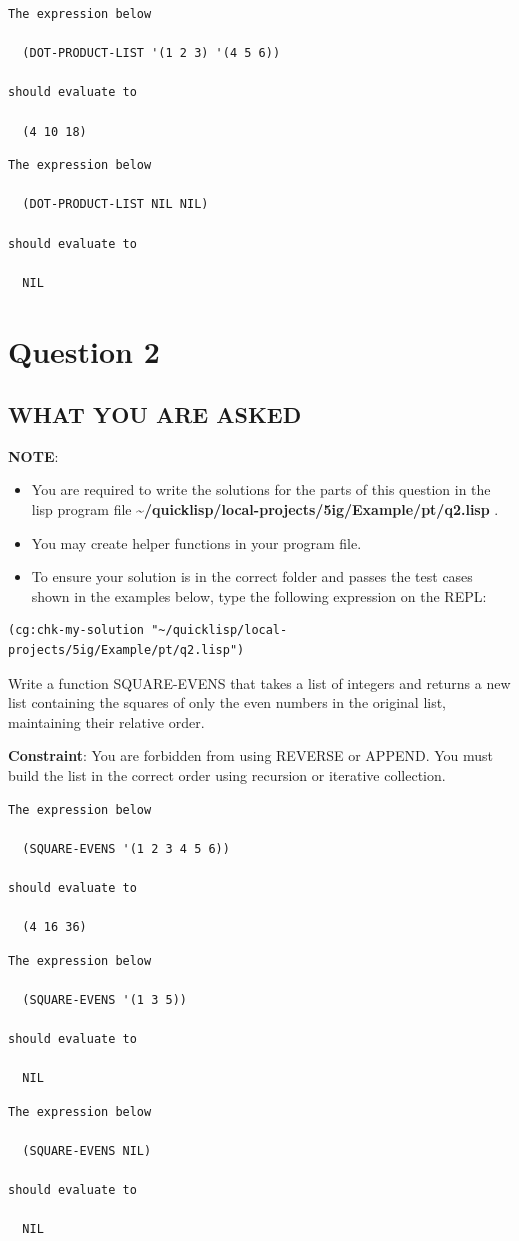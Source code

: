 \documentclass[11pt]{article}
\begin{document}
\begin{verbatim}
The expression below

  (DOT-PRODUCT-LIST '(1 2 3) '(4 5 6))

should evaluate to

  (4 10 18)
\end{verbatim}

\begin{verbatim}
The expression below

  (DOT-PRODUCT-LIST NIL NIL)

should evaluate to

  NIL
\end{verbatim}

\section*{Question 2}
\label{sec:orga4c6b4a}

\subsection*{WHAT YOU ARE ASKED}
\label{sec:org2cf8830}


\textbf{NOTE}:
\begin{itemize}
\item You are required to write the solutions for the parts of this question in the lisp program file \textbf{\textasciitilde{}/quicklisp/local-projects/5ig/Example/pt/q2.lisp} .
\item You may create helper functions in your program file.
\item To ensure your solution is in the correct folder and passes the test cases shown in the examples below,  type the following expression on the REPL:
\end{itemize}

\begin{verbatim}
(cg:chk-my-solution "~/quicklisp/local-projects/5ig/Example/pt/q2.lisp")
\end{verbatim}

Write a function SQUARE-EVENS that takes a list of integers and returns a new list containing the squares of only the even numbers in the original list, maintaining their relative order. 

\textbf{Constraint}: You are forbidden from using REVERSE or APPEND. You must build the list in the correct order using recursion or iterative collection.

\begin{verbatim}
The expression below

  (SQUARE-EVENS '(1 2 3 4 5 6))

should evaluate to

  (4 16 36)
\end{verbatim}

\begin{verbatim}
The expression below

  (SQUARE-EVENS '(1 3 5))

should evaluate to

  NIL
\end{verbatim}

\begin{verbatim}
The expression below

  (SQUARE-EVENS NIL)

should evaluate to

  NIL
\end{verbatim}
\end{document}
